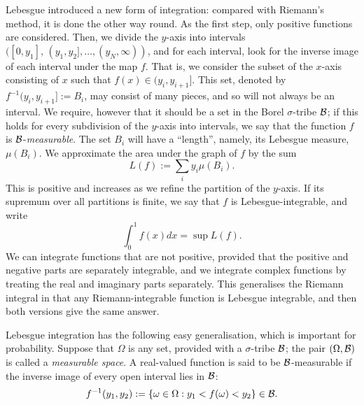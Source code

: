 Lebesgue introduced a new form of integration: compared
with Riemann's method, it is done
the other way round. As the first step, only positive functions are
considered. Then, we divide the $y$-axis into intervals $([0,y_1],
\,(y_1,y_2],\ldots,(y_N,\infty))$, and for each interval, look for the
inverse image of each interval under the map $f$. That is, we
consider the subset of the $x$-axis consisting of $x$ such that $f(x)\in
(y_i,y_{i+1}]$. This set, denoted by $f^{-1}(y_i,y_{i+1}]:=B_i$, may
consist of many pieces, and so will not
always be an interval. We require, however that it should be a set in
the Borel $\sigma$-tribe ${\cal B}$; if this holds for every
subdivision of the $y$-axis into intervals, we say that the function $f$
is ${\cal B}$-{\em measurable}. The set $B_i$ will have a ``length'',
namely, its Lebesgue measure, $\mu(B_i)$.
We approximate the area under the graph of $f$ 
by the sum
\[ L(f):=\sum_i y_i\mu(B_i).\]
This is positive and increases as we refine the partition
of the $y$-axis. If its supremum over all partitions is finite, we say
that $f$ is Lebesgue-integrable, and write
\begin{equation}
\int_0^1 f(x)dx=\sup L(f).
\end{equation}
We can integrate functions that are not positive, provided that the
positive and negative parts are separately integrable, and we integrate
complex functions by treating the real and imaginary parts separately.
This generalises the Riemann integral in that any Riemann-integrable
function is Lebesgue integrable, and then both versions give the same
answer. 

Lebesgue integration has the following easy generalisation, which is
important for
probability. Suppose that $\Omega$ is any set, provided with a
$\sigma$-tribe ${\cal B}$; the pair $(\Omega,{\cal B})$ is called
a {\em measurable space}.
A real-valued function is said to be ${\cal B}$-measurable
if the inverse image of every open interval lies in ${\cal B}$:
\[f^{-1}(y_1,y_2):=\{\omega\in\Omega:y_1<f(\omega)<y_2\}\in{\cal B}.\]

